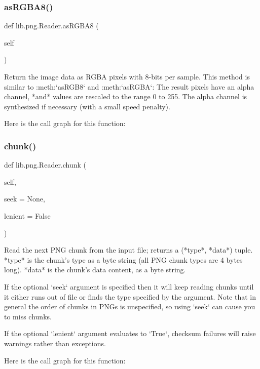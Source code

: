 \subsubsection{\texorpdfstring{as\+R\+G\+B\+A8()}{asRGBA8()}}
{\footnotesize\ttfamily def lib.\+png.\+Reader.\+as\+R\+G\+B\+A8 (\begin{DoxyParamCaption}\item[{}]{self }\end{DoxyParamCaption})}

\begin{DoxyVerb}Return the image data as RGBA pixels with 8-bits per
sample.  This method is similar to :meth:`asRGB8` and
:meth:`asRGBA`:  The result pixels have an alpha channel, *and*
values are rescaled to the range 0 to 255.  The alpha channel is
synthesized if necessary (with a small speed penalty).
\end{DoxyVerb}
 Here is the call graph for this function\+:
\mbox{\label{classlib_1_1png_1_1_reader_ab9802ec7e407d1ea9e5f69b9a0af1ed0}} 
\subsubsection{\texorpdfstring{chunk()}{chunk()}}
{\footnotesize\ttfamily def lib.\+png.\+Reader.\+chunk (\begin{DoxyParamCaption}\item[{}]{self,  }\item[{}]{seek = {\ttfamily None},  }\item[{}]{lenient = {\ttfamily False} }\end{DoxyParamCaption})}

\begin{DoxyVerb}Read the next PNG chunk from the input file; returns a
(*type*, *data*) tuple.  *type* is the chunk's type as a
byte string (all PNG chunk types are 4 bytes long).
*data* is the chunk's data content, as a byte string.

If the optional `seek` argument is
specified then it will keep reading chunks until it either runs
out of file or finds the type specified by the argument.  Note
that in general the order of chunks in PNGs is unspecified, so
using `seek` can cause you to miss chunks.

If the optional `lenient` argument evaluates to `True`,
checksum failures will raise warnings rather than exceptions.
\end{DoxyVerb}
 Here is the call graph for this function\+:
\mbox{\label{classlib_1_1png_1_1_reader_a6cf6dd680cba262114a176e79bfc8637}} 
